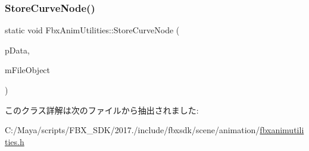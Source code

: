 \subsubsection{\texorpdfstring{Store\+Curve\+Node()}{StoreCurveNode()}}
{\footnotesize\ttfamily static void Fbx\+Anim\+Utilities\+::\+Store\+Curve\+Node (\begin{DoxyParamCaption}\item[{\hyperlink{class_fbx_anim_utilities_1_1_curve_node_intfce}{Curve\+Node\+Intfce} \&}]{p\+Data,  }\item[{\hyperlink{class_fbx_i_o}{Fbx\+IO} $\ast$}]{m\+File\+Object }\end{DoxyParamCaption})\hspace{0.3cm}{\ttfamily [static]}}



このクラス詳解は次のファイルから抽出されました\+:\begin{DoxyCompactItemize}
\item 
C\+:/\+Maya/scripts/\+F\+B\+X\+\_\+\+S\+D\+K/2017./include/fbxsdk/scene/animation/\hyperlink{fbxanimutilities_8h}{fbxanimutilities.\+h}\end{DoxyCompactItemize}
